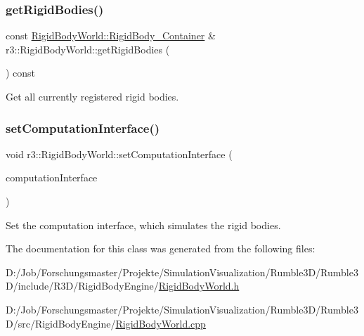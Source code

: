 \subsubsection{\texorpdfstring{get\+Rigid\+Bodies()}{getRigidBodies()}\hspace{0.1cm}{\footnotesize\ttfamily [2/2]}}
{\footnotesize\ttfamily const \mbox{\hyperlink{classr3_1_1_rigid_body_world_abe8c123eee198b6f8eca079e71302bcb}{Rigid\+Body\+World\+::\+Rigid\+Body\+\_\+\+Container}} \& r3\+::\+Rigid\+Body\+World\+::get\+Rigid\+Bodies (\begin{DoxyParamCaption}{ }\end{DoxyParamCaption}) const}

Get all currently registered rigid bodies. \mbox{\label{classr3_1_1_rigid_body_world_a0c5724007917231ebe9bd970d65b0bfe}} 
\subsubsection{\texorpdfstring{set\+Computation\+Interface()}{setComputationInterface()}}
{\footnotesize\ttfamily void r3\+::\+Rigid\+Body\+World\+::set\+Computation\+Interface (\begin{DoxyParamCaption}\item[{\mbox{\hyperlink{classr3_1_1_rigid_body_engine_c_i}{Rigid\+Body\+Engine\+CI}} $\ast$}]{computation\+Interface }\end{DoxyParamCaption})}

Set the computation interface, which simulates the rigid bodies. 

The documentation for this class was generated from the following files\+:\begin{DoxyCompactItemize}
\item 
D\+:/\+Job/\+Forschungsmaster/\+Projekte/\+Simulation\+Visualization/\+Rumble3\+D/\+Rumble3\+D/include/\+R3\+D/\+Rigid\+Body\+Engine/\mbox{\hyperlink{_rigid_body_world_8h}{Rigid\+Body\+World.\+h}}\item 
D\+:/\+Job/\+Forschungsmaster/\+Projekte/\+Simulation\+Visualization/\+Rumble3\+D/\+Rumble3\+D/src/\+Rigid\+Body\+Engine/\mbox{\hyperlink{_rigid_body_world_8cpp}{Rigid\+Body\+World.\+cpp}}\end{DoxyCompactItemize}
